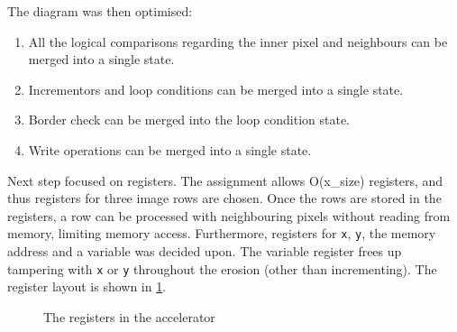 \documentclass[a4paper, english]{article}
\numberwithin{equation}{section}
\begin{document}
The diagram was then optimised:
\begin{enumerate}
    \item All the logical comparisons regarding the inner pixel and neighbours can be merged into a single state.
    \item Incrementors and loop conditions can be merged into a single state.
    \item Border check can be merged into the loop condition state.
    \item Write operations can be merged into a single state.
\end{enumerate}
Next step focused on registers. The assignment allows O(x\_size) registers, and thus registers for three image rows are chosen. Once the rows are stored in the registers, a row can be processed with neighbouring pixels without reading from memory, limiting memory access. Furthermore, registers for \texttt{x}, \texttt{y}, the memory address and a variable was decided upon. The variable register frees up tampering with \texttt{x} or \texttt{y} throughout the erosion (other than incrementing). The register layout is shown in \cref{fig:regs}.
\begin{figure}
    \centering
    \caption{The registers in the accelerator}\label{fig:regs}
\end{figure}
\end{document}
